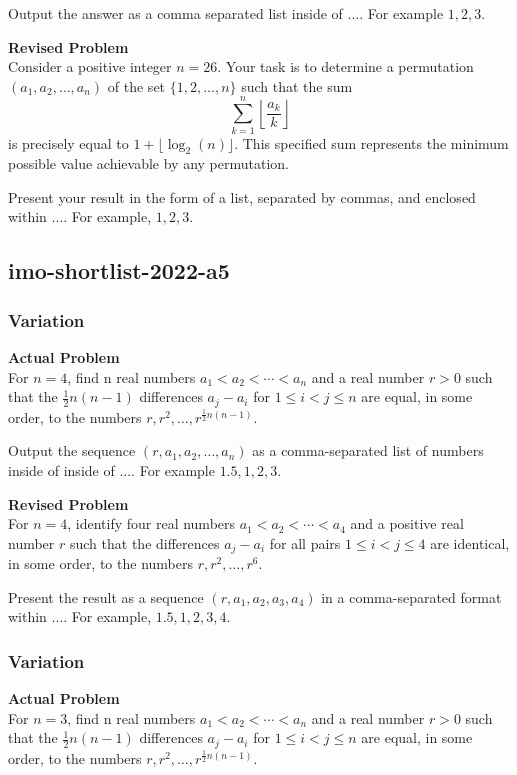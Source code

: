 Output the answer as a comma separated list inside of $\boxed{...}$. For example $\boxed{1, 2, 3}$.

\textbf{Revised Problem}\\
Consider a positive integer $n = 26$. Your task is to determine a permutation $(a_1, a_2, \ldots, a_n)$ of the set $\{1, 2, \ldots, n\}$ such that the sum
$$ \sum_{k=1}^{n} \left\lfloor \frac{a_k}{k} \right\rfloor $$
is precisely equal to $1 + \lfloor \log_2(n) \rfloor$. This specified sum represents the minimum possible value achievable by any permutation.

Present your result in the form of a list, separated by commas, and enclosed within $\boxed{...}$. For example, $\boxed{1, 2, 3}$.

\subsection{imo-shortlist-2022-a5}
\subsubsection{Variation}
\textbf{Actual Problem}\\
For $n = 4$, find n real numbers $a_1 < a_2 < \cdots < a_n$ and a real number $r > 0$ such that the $\frac{1}{2}n(n-1)$ differences $a_j - a_i$ for $1 \leq i < j \leq n$ are equal, in some order, to the numbers $r, r^2, \ldots, r^{\frac{1}{2}n(n-1)}$.

Output the sequence $(r, a_1, a_2, \ldots, a_n)$ as a comma-separated list of numbers inside of inside of $\boxed{...}$. For example $\boxed{1.5, 1, 2, 3}$.

\textbf{Revised Problem}\\
For $n = 4$, identify four real numbers $a_1 < a_2 < \cdots < a_4$ and a positive real number $r$ such that the differences $a_j - a_i$ for all pairs $1 \leq i < j \leq 4$ are identical, in some order, to the numbers $r, r^2, \ldots, r^6$.

Present the result as a sequence $(r, a_1, a_2, a_3, a_4)$ in a comma-separated format within $\boxed{...}$. For example, $\boxed{1.5, 1, 2, 3, 4}$.

\subsubsection{Variation}
\textbf{Actual Problem}\\
For $n = 3$, find n real numbers $a_1 < a_2 < \cdots < a_n$ and a real number $r > 0$ such that the $\frac{1}{2}n(n-1)$ differences $a_j - a_i$ for $1 \leq i < j \leq n$ are equal, in some order, to the numbers $r, r^2, \ldots, r^{\frac{1}{2}n(n-1)}$.

